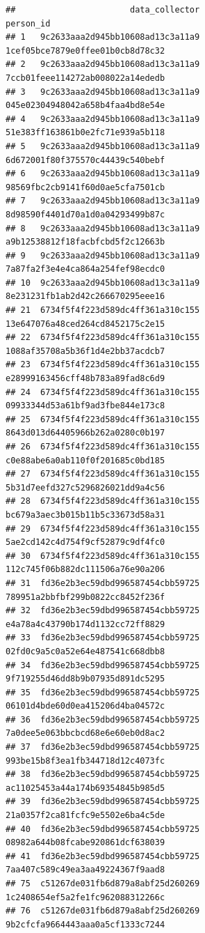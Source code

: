 \documentclass[]{article}
\begin{document}
\begin{verbatim}
##                       data_collector                          person_id
## 1   9c2633aaa2d945bb10608ad13c3a11a9   1cef05bce7879e0ffee01b0cb8d78c32
## 2   9c2633aaa2d945bb10608ad13c3a11a9   7ccb01feee114272ab008022a14ededb
## 3   9c2633aaa2d945bb10608ad13c3a11a9   045e02304948042a658b4faa4bd8e54e
## 4   9c2633aaa2d945bb10608ad13c3a11a9   51e383ff163861b0e2fc71e939a5b118
## 5   9c2633aaa2d945bb10608ad13c3a11a9   6d672001f80f375570c44439c540bebf
## 6   9c2633aaa2d945bb10608ad13c3a11a9   98569fbc2cb9141f60d0ae5cfa7501cb
## 7   9c2633aaa2d945bb10608ad13c3a11a9   8d98590f4401d70a1d0a04293499b87c
## 8   9c2633aaa2d945bb10608ad13c3a11a9   a9b12538812f18facbfcbd5f2c12663b
## 9   9c2633aaa2d945bb10608ad13c3a11a9   7a87fa2f3e4e4ca864a254fef98ecdc0
## 10  9c2633aaa2d945bb10608ad13c3a11a9   8e231231fb1ab2d42c266670295eee16
## 21  6734f5f4f223d589dc4ff361a310c155   13e647076a48ced264cd8452175c2e15
## 22  6734f5f4f223d589dc4ff361a310c155   1088af35708a5b36f1d4e2bb37acdcb7
## 23  6734f5f4f223d589dc4ff361a310c155   e28999163456cff48b783a89fad8c6d9
## 24  6734f5f4f223d589dc4ff361a310c155   09933344d53a61bf9ad3fbe844e173c8
## 25  6734f5f4f223d589dc4ff361a310c155   8643d013d64405966b262a0280c0b197
## 26  6734f5f4f223d589dc4ff361a310c155   c0e88abe6a0ab110f0f201685c0bd185
## 27  6734f5f4f223d589dc4ff361a310c155   5b31d7eefd327c5296826021dd9a4c56
## 28  6734f5f4f223d589dc4ff361a310c155   bc679a3aec3b015b11b5c33673d58a31
## 29  6734f5f4f223d589dc4ff361a310c155   5ae2cd142c4d754f9cf52879c9df4fc0
## 30  6734f5f4f223d589dc4ff361a310c155   112c745f06b882dc111506a76e90a206
## 31  fd36e2b3ec59dbd996587454cbb59725   789951a2bbfbf299b0822cc8452f236f
## 32  fd36e2b3ec59dbd996587454cbb59725   e4a78a4c43790b174d1132cc72ff8829
## 33  fd36e2b3ec59dbd996587454cbb59725   02fd0c9a5c0a52e64e487541c668dbb8
## 34  fd36e2b3ec59dbd996587454cbb59725   9f719255d46dd8b9b07935d891dc5295
## 35  fd36e2b3ec59dbd996587454cbb59725   06101d4bde60d0ea415206d4ba04572c
## 36  fd36e2b3ec59dbd996587454cbb59725   7a0dee5e063bbcbcd68e6e60eb0d8ac2
## 37  fd36e2b3ec59dbd996587454cbb59725   993be15b8f3ea1fb344718d12c4073fc
## 38  fd36e2b3ec59dbd996587454cbb59725   ac11025453a44a174b69354845b985d5
## 39  fd36e2b3ec59dbd996587454cbb59725   21a0357f2ca81fcfc9e5502e6ba4c5de
## 40  fd36e2b3ec59dbd996587454cbb59725   08982a644b08fcabe920861dcf638039
## 41  fd36e2b3ec59dbd996587454cbb59725   7aa407c589c49ea3aa49224367f9aad8
## 75  c51267de031fb6d879a8abf25d260269   1c2408654ef5a2fe1fc962088312266c
## 76  c51267de031fb6d879a8abf25d260269   9b2cfcfa9664443aaa0a5cf1333c7244

\end{verbatim}
\end{document}
